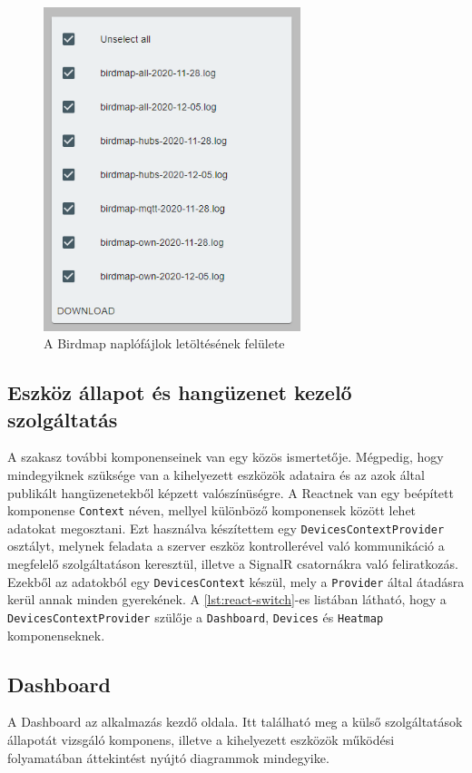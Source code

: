 \begin{figure}[!ht]
    \centering
    \includegraphics[width=75mm, keepaspectratio]{figures/birdmap-logs.png}
    \caption{A Birdmap naplófájlok letöltésének felülete}
    \label{fig:birdmap-logs}
\end{figure}
\subsection{Eszköz állapot és hangüzenet kezelő szolgáltatás}
A szakasz további komponenseinek van egy közös ismertetője. Mégpedig, hogy mindegyiknek szüksége van a kihelyezett eszközök adataira
és az azok által publikált hangüzenetekből képzett valószínüségre.
A Reactnek van egy beépített komponense \verb+Context+\cite{react-context} néven, mellyel különböző komponensek között lehet adatokat megosztani.
Ezt használva készítettem egy \verb+DevicesContextProvider+ osztályt, melynek feladata a szerver eszköz kontrollerével való kommunikáció a megfelelő szolgáltatáson keresztül,
illetve a SignalR csatornákra való feliratkozás. Ezekből az adatokból egy \verb+DevicesContext+ készül, mely a \verb+Provider+ által átadásra kerül annak minden gyerekének.
A \ref{lst:react-switch}-es listában látható, hogy a \verb+DevicesContextProvider+ szülője a \verb+Dashboard+, \verb+Devices+ és \verb+Heatmap+ komponenseknek.

\subsection{Dashboard}
A Dashboard az alkalmazás kezdő oldala. Itt található meg a külső szolgáltatások állapotát vizsgáló komponens,
illetve a kihelyezett eszközök működési folyamatában áttekintést nyújtó diagrammok mindegyike.

